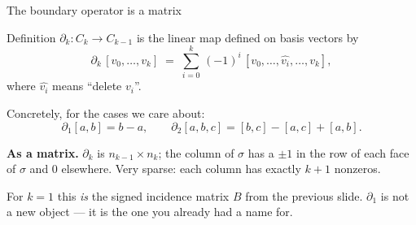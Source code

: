 \documentclass[10pt,aspectratio=169]{beamer}
\begin{document}
    \begin{frame}[shrink=12]{The boundary operator is a matrix}
        \begin{block}{Definition}
            $\partial_k : C_k\to C_{k-1}$ is the linear map defined on basis vectors by
            \[
                \partial_k\,[v_0,\dots,v_k]\;=\;\sum_{i=0}^{k}\,(-1)^i\,[v_0,\dots,\widehat{v_i},\dots,v_k],
            \]
            where $\widehat{v_i}$ means ``delete $v_i$''.
        \end{block}

        \vspace{0.4em}
        Concretely, for the cases we care about:
        \[
            \partial_1[a,b] = b-a, \qquad
            \partial_2[a,b,c] = [b,c]-[a,c]+[a,b].
        \]

        \vspace{0.4em}

        \textbf{As a matrix.} $\partial_k$ is $n_{k-1}\times n_k$; the column of $\sigma$ has a
        $\pm1$ in the row of each face of $\sigma$ and $0$ elsewhere. Very sparse: each
        column has exactly $k+1$ nonzeros.

        \vspace{0.4em}
        For $k=1$ this \emph{is} the signed incidence matrix $B$ from the previous slide.
        $\partial_1$ is not a new object --- it is the one you already had a name for.
    \end{frame}
\end{document}
